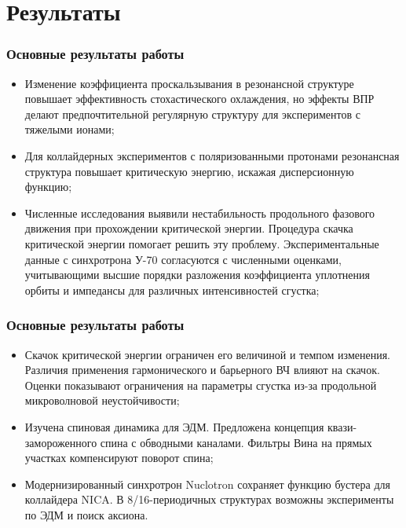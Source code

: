 \section{Результаты}
\begin{frame}
	\frametitle{Основные результаты работы}
	\begin{itemize}
		\item Изменение коэффициента проскальзывания в резонансной структуре повышает эффективность стохастического охлаждения, но эффекты ВПР делают предпочтительной регулярную структуру для экспериментов с тяжелыми ионами;
		\vspace{1em}
		\item Для коллайдерных экспериментов с поляризованными протонами резонансная структура повышает критическую энергию, искажая дисперсионную функцию;
		\vspace{1em}
		\item Численные исследования выявили нестабильность продольного фазового движения при прохождении критической энергии. Процедура скачка критической энергии помогает решить эту проблему. Экспериментальные данные с синхротрона У-70 согласуются с численными оценками, учитывающими высшие порядки разложения коэффициента уплотнения орбиты и импедансы для различных интенсивностей сгустка;
	\end{itemize}
\end{frame}
\begin{frame}
	\frametitle{Основные результаты работы}
	\begin{itemize}
		\item Скачок критической энергии ограничен его величиной и темпом изменения. Различия применения гармонического и барьерного ВЧ влияют на скачок. Оценки показывают ограничения на параметры сгустка из-за продольной микроволновой неустойчивости;
		\vspace{1em}
		\item Изучена спиновая динамика для ЭДМ. Предложена концепция квази-замороженного спина с обводными каналами. Фильтры Вина на прямых участках компенсируют поворот спина;
		\vspace{1em}
		\item Модернизированный синхротрон Nuclotron сохраняет функцию бустера для коллайдера NICA. В 8/16-периодичных структурах возможны эксперименты по ЭДМ и поиск аксиона.
	\end{itemize}
\end{frame}
